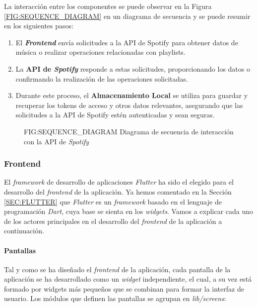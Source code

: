La interacción entre los componentes se puede observar en la Figura \ref{FIG:SEQUENCE_DIAGRAM} en un diagrama de secuencia
y se puede resumir en los siguientes pasos:

\begin{enumerate}
    \item El \textbf{\textit{Frontend}} envía solicitudes a la API de Spotify para obtener datos de música o realizar operaciones relacionadas con playlists.
    \item La \textbf{API de \textit{Spotify}} responde a estas solicitudes, proporcionando los datos o confirmando la realización de las operaciones solicitadas.
    \item Durante este proceso, el \textbf{Almacenamiento Local} se utiliza para guardar y recuperar los tokens de acceso y otros datos relevantes, asegurando 
    que las solicitudes a la API de Spotify estén autenticadas y sean seguras.
\end{enumerate}


\begin{figure}[Diagrama de secuencia de interacción con la API de \textit{Spotify}]{FIG:SEQUENCE_DIAGRAM}
    {Diagrama de secuencia de interacción con la API de \textit{Spotify}}
\end{figure}



\subsubsection{Frontend\label{subsec:frontend}}

El \textit{framework} de desarrollo de aplicaciones \textit{Flutter} \cite{flutter} ha sido el elegido para el desarrollo del \textit{frontend} de la aplicación. Ya hemos
comentado en la Sección \ref{SEC:FLUTTER} que \textit{Flutter} es un \textit{framework} basado en el lenguaje de programación \textit{Dart}, cuya base se sienta
en los \textit{widgets}. Vamos a explicar cada uno de los actores principales en el desarrollo del \textit{frontend} de la aplicación a continuación.

\paragraph{Pantallas}

Tal y como se ha diseñado el \textit{frontend} de la aplicación, cada pantalla de la aplicación se ha desarrollado como un \textit{widget} independiente, 
el cual, a su vez está formado por widgets más pequeños que se combinan para formar la interfaz de usuario. Los módulos que definen las pantallas se agrupan en \textit{lib/screens}:


